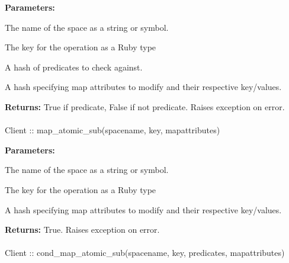 \noindent\textbf{Parameters:}
\begin{description}[labelindent=\widthof{{\code{mapattributes}}},leftmargin=*,noitemsep,nolistsep,align=right]
\item[\code{spacename}] The name of the space as a string or symbol.
\item[\code{key}] The key for the operation as a Ruby type
\item[\code{predicates}] A hash of predicates to check against.
\item[\code{mapattributes}] A hash specifying map attributes to modify and their respective key/values.
\end{description}

\noindent\textbf{Returns:}
True if predicate, False if not predicate.  Raises exception on error.

\paragraph{}
\label{api:ruby:map_atomic_sub}
\begin{rubycode}
Client :: map_atomic_sub(spacename, key, mapattributes)
\end{rubycode}


\noindent\textbf{Parameters:}
\begin{description}[labelindent=\widthof{{\code{mapattributes}}},leftmargin=*,noitemsep,nolistsep,align=right]
\item[\code{spacename}] The name of the space as a string or symbol.
\item[\code{key}] The key for the operation as a Ruby type
\item[\code{mapattributes}] A hash specifying map attributes to modify and their respective key/values.
\end{description}

\noindent\textbf{Returns:}
True.  Raises exception on error.

\paragraph{}
\label{api:ruby:cond_map_atomic_sub}
\begin{rubycode}
Client :: cond_map_atomic_sub(spacename, key, predicates, mapattributes)
\end{rubycode}


